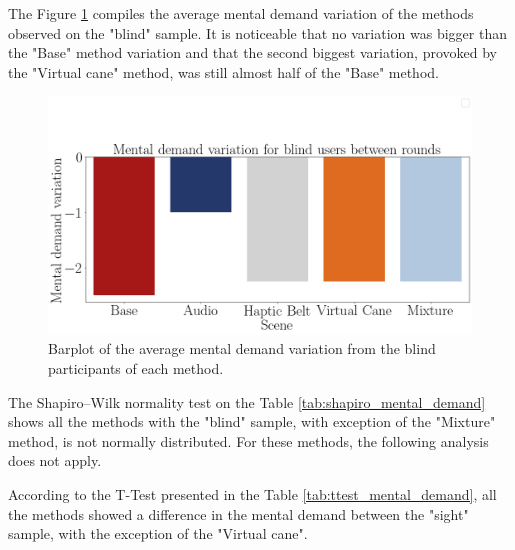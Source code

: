 



The Figure \ref{fig:barplot_md_var_scene_blind} compiles the average mental demand variation of the methods observed on the "blind" sample. It is noticeable that no variation was bigger than the "Base" method variation and that the second biggest variation, provoked by the "Virtual cane" method, was still almost half of the "Base" method.

\begin{figure}[!htb]
    \centering
    \includegraphics[width = 0.8\linewidth]{Resultados/Nasa/Figuras/png/barplot_md_var_scene_blind.png}
    \caption{Barplot of the average mental demand variation from the blind participants of each method.}
    \label{fig:barplot_md_var_scene_blind}
\end{figure}

The Shapiro–Wilk normality test on the Table \ref{tab:shapiro_mental_demand} shows all the methods with the "blind" sample, with exception of the "Mixture" method, is not normally distributed. For these methods, the following analysis does not apply.

According to the T-Test presented in the Table \ref{tab:ttest_mental_demand}, all the methods showed a difference in the mental demand between the "sight" sample, with the exception of the "Virtual cane".

\begin{table}[!htb]
    \begin{minipage}{.45\linewidth}
        
    \end{minipage}
    \hfill
    \begin{minipage}{.45\linewidth}
        \vspace{-2.75cm}
        
    \end{minipage}
\end{table}

